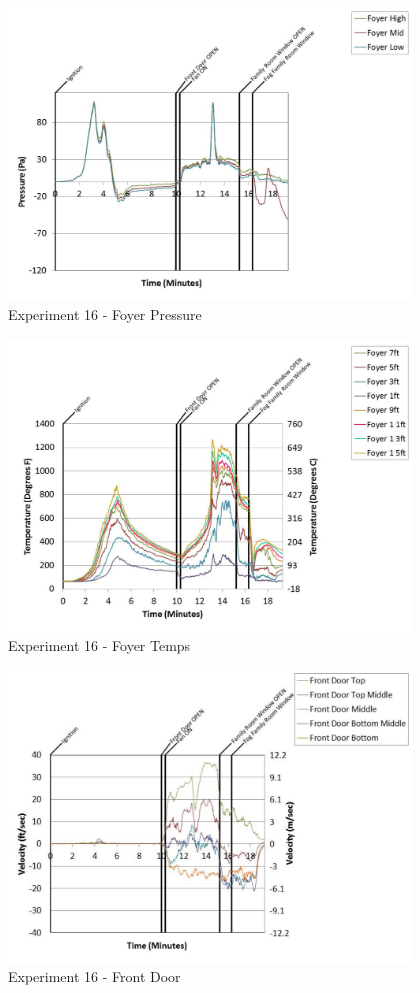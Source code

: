\documentclass{article}
\begin{document}
\begin{appendices}
	\begin{figure}[h!]
		\centering
		\includegraphics[height=3.05in]{0_Images/Results_Charts/Exp_16_Charts/FoyerPressure.pdf}
		\caption{Experiment 16 - Foyer Pressure}
	\end{figure}
 
	\clearpage

	\begin{figure}[h!]
		\centering
		\includegraphics[height=3.05in]{0_Images/Results_Charts/Exp_16_Charts/FoyerTemps.pdf}
		\caption{Experiment 16 - Foyer Temps}
	\end{figure}
 

	\begin{figure}[h!]
		\centering
		\includegraphics[height=3.05in]{0_Images/Results_Charts/Exp_16_Charts/FrontDoor.pdf}
		\caption{Experiment 16 - Front Door}
	\end{figure}
 

\end{appendices}
\end{document}
